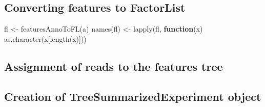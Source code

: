 \documentclass[12pt,twoside]{reedthesis}
\newenvironment{Shaded}{\begin{snugshade}}{\end{snugshade}}
\newcommand{\AttributeTok}[1]{\textcolor[rgb]{0.77,0.63,0.00}{#1}}
\newcommand{\ConstantTok}[1]{\textcolor[rgb]{0.00,0.00,0.00}{#1}}
\newcommand{\ControlFlowTok}[1]{\textcolor[rgb]{0.13,0.29,0.53}{\textbf{#1}}}
\newcommand{\FunctionTok}[1]{\textcolor[rgb]{0.00,0.00,0.00}{#1}}
\newcommand{\NormalTok}[1]{#1}
\newcommand{\OtherTok}[1]{\textcolor[rgb]{0.56,0.35,0.01}{#1}}
\newcommand{\SpecialCharTok}[1]{\textcolor[rgb]{0.00,0.00,0.00}{#1}}
\begin{document}
\hypertarget{converting-features-to-factorlist}{%
\subsection*{Converting features to FactorList}\label{converting-features-to-factorlist}}
\begin{Shaded}
\begin{Highlighting}[]
\NormalTok{fl }\OtherTok{\textless{}{-}} \FunctionTok{featuresAnnoToFL}\NormalTok{(a)}
\FunctionTok{names}\NormalTok{(fl) }\OtherTok{\textless{}{-}} \FunctionTok{lapply}\NormalTok{(fl, }\ControlFlowTok{function}\NormalTok{(x) }\FunctionTok{as.character}\NormalTok{(x[}\FunctionTok{length}\NormalTok{(x)]))}
\end{Highlighting}
\end{Shaded}
\hypertarget{assignment-of-reads-to-the-features-tree}{%
\subsection*{Assignment of reads to the features tree}\label{assignment-of-reads-to-the-features-tree}}
\begin{Shaded}
\end{Shaded}
\hypertarget{creation-of-treesummarizedexperiment-object}{%
\subsection*{Creation of TreeSummarizedExperiment object}\label{creation-of-treesummarizedexperiment-object}}
\end{document}
